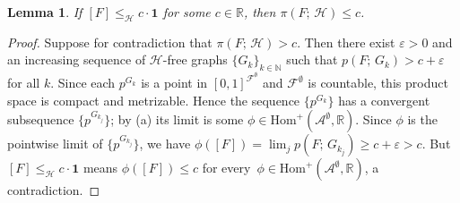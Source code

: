 \documentclass[10pt,a4paper]{amsart}
\newtheorem{lemma}{Lemma}
\newcommand{\den}[2]{p(#1;\,#2)}
\newcommand{\poshom}[1]{\mathrm{Hom}^+(\mathcal{A}^{#1}, \mathbb{R})}
\newcommand{\tdensity}[2]{\pi(#1;\,#2)}
\begin{document}
\begin{lemma}\label{lem:semantic-bound}
  If $[F] \leq_{\mathcal{H}} c \cdot \mathbf{1}$ for some $c \in \mathbb{R}$, then
  $\tdensity{F}{\mathcal{H}} \leq c$.
\end{lemma}

\begin{proof}
  Suppose for contradiction that $\tdensity{F}{\mathcal{H}} > c$.  Then
  there exist $\varepsilon > 0$ and an increasing sequence of
  \(\mathcal{H}\)-free graphs $\{G_k\}_{k\in\mathbb{N}}$ such that
  $\den{F}{G_k} > c + \varepsilon$ for all $k$.  Since each $p^{G_k}$
  is a point in $[0,1]^{\mathcal{F}^\emptyset}$ and
  $\mathcal{F}^\emptyset$ is countable, this product space is compact and
  metrizable.  Hence the sequence $\{p^{G_k}\}$ has a convergent
  subsequence $\{p^{G_{k_j}}\}$; by (a) its limit is some
  $\phi \in \poshom{\emptyset}$.  Since $\phi$ is the pointwise limit of
  $\{p^{G_{k_j}}\}$, we have
  $\phi([F]) = \lim_j \den{F}{G_{k_j}} \geq c + \varepsilon > c$.  But
  $[F] \leq_{\mathcal{H}} c \cdot \mathbf{1}$ means $\phi([F]) \leq c$ for every~$\phi \in \poshom{\emptyset}$, a contradiction.
\end{proof}
\end{document}
